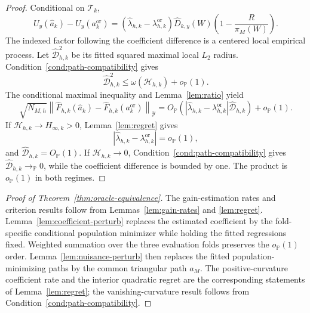 \begin{proof}
Conditional on \(\mathcal T_k\),
\begin{equation}
U_y(\widehat a_k)-U_y(a_k^{\mathrm{or}})
=
(\widehat\lambda_{h,k}-\lambda_{h,k}^{\mathrm{or}})
\widehat D_{k,y}(W)
\left(1-\frac{R}{\pi_M(W)}\right).
\label{eq:lambda-exact}
\end{equation}
The indexed factor following the coefficient difference is a centered local empirical process. Let \(\widehat{\mathcal D}_{h,k}^2\) be its fitted squared maximal local \(L_2\) radius. Condition~\ref{cond:path-compatibility} gives
\[
\widehat{\mathcal D}_{h,k}^2
\le
\omega(\mathcal H_{h,k})+o_{\mathbb P}(1).
\]
The conditional maximal inequality and Lemma~\ref{lem:ratio} yield
\[
\sqrt{N_{M,h}}
\left\|
\widehat F_{h,k}(\widehat a_k)
-
\widehat F_{h,k}(a_k^{\mathrm{or}})
\right\|_{\mathcal Y}
=
O_{\mathbb P}\left(
|\widehat\lambda_{h,k}-\lambda_{h,k}^{\mathrm{or}}|
\widehat{\mathcal D}_{h,k}
\right)+o_{\mathbb P}(1).
\]
If \(\mathcal H_{h,k}\to H_{\infty,k}>0\), Lemma~\ref{lem:regret} gives
\[
|\widehat\lambda_{h,k}-\lambda_{h,k}^{\mathrm{or}}|
=o_{\mathbb P}(1),
\]
and \(\widehat{\mathcal D}_{h,k}=O_{\mathbb P}(1)\). If \(\mathcal H_{h,k}\to0\), Condition~\ref{cond:path-compatibility} gives \(\widehat{\mathcal D}_{h,k}\to_{\mathbb P}0\), while the coefficient difference is bounded by one. The product is \(o_{\mathbb P}(1)\) in both regimes.
\end{proof}

\begin{proof}[Proof of Theorem~\ref{thm:oracle-equivalence}]
The gain-estimation rates and criterion results follow from Lemmas~\ref{lem:gain-rates} and \ref{lem:regret}. Lemma~\ref{lem:coefficient-perturb} replaces the estimated coefficient by the fold-specific conditional population minimizer while holding the fitted regressions fixed. Weighted summation over the three evaluation folds preserves the \(o_{\mathbb P}(1)\) order. Lemma~\ref{lem:nuisance-perturb} then replaces the fitted population-minimizing paths by the common triangular path \(a_M\). The positive-curvature coefficient rate and the interior quadratic regret are the corresponding statements of Lemma~\ref{lem:regret}; the vanishing-curvature result follows from Condition~\ref{cond:path-compatibility}.
\end{proof}
